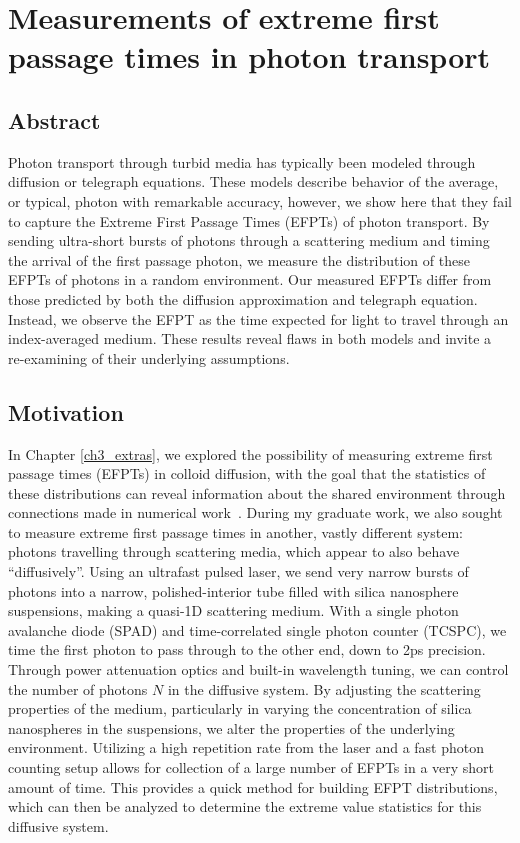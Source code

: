 \chapter{Measurements of extreme first passage times in photon transport}
\label{ch4_photons}


\section{Abstract}
Photon transport through turbid media has typically been modeled through diffusion or telegraph equations. These models describe behavior of the average, or typical, photon with remarkable accuracy, however, we show here that they fail to capture the Extreme First Passage Times (EFPTs) of photon transport. By sending ultra-short bursts of photons through a scattering medium and timing the arrival of the first passage photon, we measure the distribution of these EFPTs of photons in a random environment. Our measured EFPTs differ from those predicted by both the diffusion approximation and telegraph equation. Instead, we observe the EFPT as the time expected for light to travel through an index-averaged medium. These results reveal flaws in both models and invite a re-examining of their underlying assumptions.

\section{Motivation}
In Chapter \ref{ch3_extras}, we explored the possibility of measuring extreme first passage times (EFPTs) in colloid diffusion, with the goal that the statistics of these distributions can reveal information about the shared environment through connections made in numerical work~\cite{hass_anomalous_2023,hass_first-passage_2024,hass_extreme_2024}. During my graduate work, we also sought to measure extreme first passage times in another, vastly different system: photons travelling through scattering media, which appear to also behave ``diffusively''. Using an ultrafast pulsed laser, we send very narrow bursts of photons into a narrow, polished-interior tube filled with silica nanosphere suspensions, making a quasi-1D scattering medium. With a single photon avalanche diode (SPAD) and time-correlated single photon counter (TCSPC), we time the first photon to pass through to the other end, down to 2ps precision. Through power attenuation optics and built-in wavelength tuning, we can control the number of photons $N$ in the diffusive system. By adjusting the scattering properties of the medium, particularly in varying the concentration of silica nanospheres in the suspensions, we alter the properties of the underlying environment. Utilizing a high repetition rate from the laser and a fast photon counting setup allows for collection of a large number of EFPTs in a very short amount of time. This provides a quick method for building EFPT distributions, which can then be analyzed to determine the extreme value statistics for this diffusive system.

